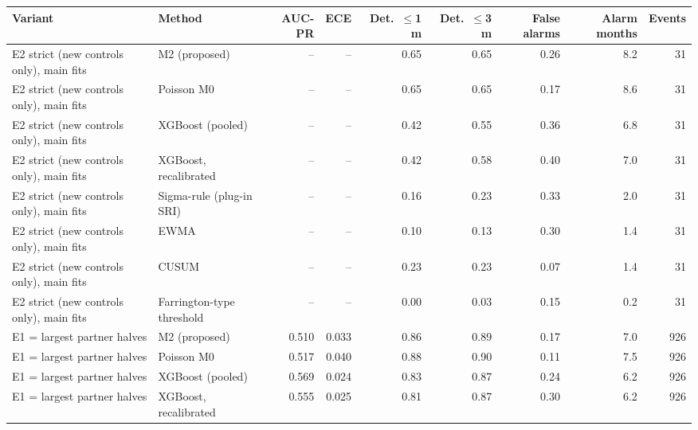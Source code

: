 \documentclass[10pt,a4paper]{article}
\begin{document}
\vspace{6pt}
\noindent\begin{minipage}{\linewidth}
\centering\tiny
\begin{tabular}{llrrrrrrr}
\toprule
Variant & Method & AUC-PR & ECE & Det.\ $\leq$1 m & Det.\ $\leq$3 m & False alarms & Alarm months & Events \\ \midrule
E2 strict (new controls only), main fits & M2 (proposed) & -- & -- & 0.65 & 0.65 & 0.26 & 8.2 & 31 \\
E2 strict (new controls only), main fits & Poisson M0 & -- & -- & 0.65 & 0.65 & 0.17 & 8.6 & 31 \\
E2 strict (new controls only), main fits & XGBoost (pooled) & -- & -- & 0.42 & 0.55 & 0.36 & 6.8 & 31 \\
E2 strict (new controls only), main fits & XGBoost, recalibrated & -- & -- & 0.42 & 0.58 & 0.40 & 7.0 & 31 \\
E2 strict (new controls only), main fits & Sigma-rule (plug-in SRI) & -- & -- & 0.16 & 0.23 & 0.33 & 2.0 & 31 \\
E2 strict (new controls only), main fits & EWMA & -- & -- & 0.10 & 0.13 & 0.30 & 1.4 & 31 \\
E2 strict (new controls only), main fits & CUSUM & -- & -- & 0.23 & 0.23 & 0.07 & 1.4 & 31 \\
E2 strict (new controls only), main fits & Farrington-type threshold & -- & -- & 0.00 & 0.03 & 0.15 & 0.2 & 31 \\
E1 = largest partner halves & M2 (proposed) & 0.510 & 0.033 & 0.86 & 0.89 & 0.17 & 7.0 & 926 \\
E1 = largest partner halves & Poisson M0 & 0.517 & 0.040 & 0.88 & 0.90 & 0.11 & 7.5 & 926 \\
E1 = largest partner halves & XGBoost (pooled) & 0.569 & 0.024 & 0.83 & 0.87 & 0.24 & 6.2 & 926 \\
E1 = largest partner halves & XGBoost, recalibrated & 0.555 & 0.025 & 0.81 & 0.87 & 0.30 & 6.2 & 926 \\

\end{tabular}
\end{minipage}
\end{document}
